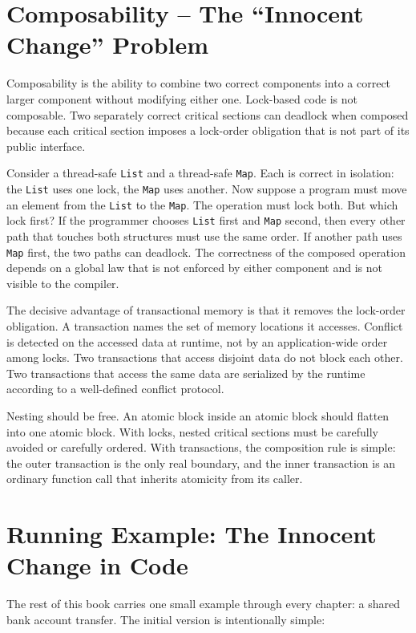 \section{Composability -- The ``Innocent Change'' Problem}

Composability is the ability to combine two correct components into a correct
larger component without modifying either one. Lock-based code is not
composable. Two separately correct critical sections can deadlock when
composed because each critical section imposes a lock-order obligation that is
not part of its public interface.

Consider a thread-safe \texttt{List} and a thread-safe \texttt{Map}. Each is
correct in isolation: the \texttt{List} uses one lock, the \texttt{Map} uses
another. Now suppose a program must move an element from the \texttt{List} to
the \texttt{Map}. The operation must lock both. But which lock first? If the
programmer chooses \texttt{List} first and \texttt{Map} second, then every
other path that touches both structures must use the same order. If another
path uses \texttt{Map} first, the two paths can deadlock. The correctness of
the composed operation depends on a global law that is not enforced by either
component and is not visible to the compiler.

The decisive advantage of transactional memory is that it removes the
lock-order obligation. A transaction names the set of memory locations it
accesses. Conflict is detected on the accessed data at runtime, not by an
application-wide order among locks. Two transactions that access disjoint data
do not block each other. Two transactions that access the same data are
serialized by the runtime according to a well-defined conflict protocol.

Nesting should be free. An atomic block inside an atomic block should flatten
into one atomic block. With locks, nested critical sections must be carefully
avoided or carefully ordered. With transactions, the composition rule is
simple: the outer transaction is the only real boundary, and the inner
transaction is an ordinary function call that inherits atomicity from its
caller.

\section{Running Example: The Innocent Change in Code}

The rest of this book carries one small example through every chapter: a
shared bank account transfer. The initial version is intentionally simple:


